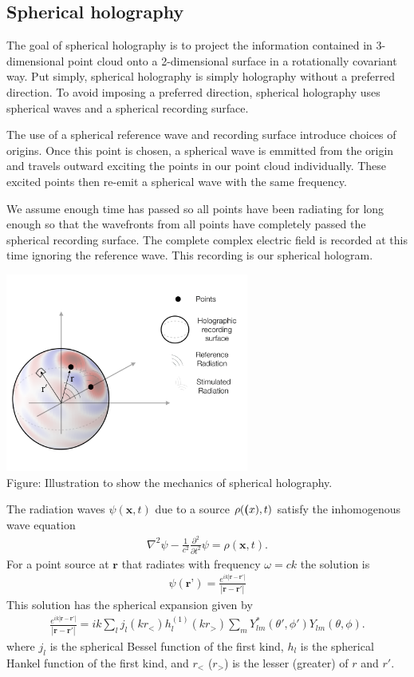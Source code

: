\documentclass{article}
\begin{document}
\subsection{Spherical holography}


The goal of spherical holography is to project the information contained in 3-dimensional point cloud onto a 2-dimensional surface in a rotationally covariant way. Put simply, spherical holography is simply holography without a preferred direction. To avoid imposing a preferred direction, spherical holography uses spherical waves and a spherical recording surface.

The use of a spherical reference wave and recording surface introduce choices of origins. Once this point is chosen, a spherical wave is emmitted from the origin and travels outward exciting the points in our point cloud individually. These excited points then re-emit a spherical wave with the same frequency. 

We assume enough time has passed so all points have been radiating for long enough so that the wavefronts from all points have completely passed the spherical recording surface. The complete complex electric field is recorded at this time ignoring the reference wave. This recording is our spherical hologram.

\begin{center}
\includegraphics[width=8cm]{hologram_example}\\
Figure: Illustration to show the mechanics of spherical holography. 
\end{center}
The radiation waves $\psi(\textbf{x},t)$ due to a source $\rho(\textbf(x),t)$ satisfy the inhomogenous wave equation
\begin{align}
    \nabla^2\psi - \frac{1}{c^2}\frac{\partial^2}{\partial t^2}\psi = \rho(\textbf{x},t).
\end{align}
For a point source at $\textbf{r}$ that radiates with frequency $\omega = ck$ the solution is 
\begin{align}
    \psi(\textbf{r'})
    =\frac{e^{ik|\textbf{r}-\textbf{r}'|}}{|\textbf{r}-\textbf{r}'|}
\end{align}
This solution has the spherical expansion given by 
\begin{align}
    \frac{e^{ik|\textbf{r}-\textbf{r}'|}}{|\textbf{r}-\textbf{r}'|} = ik\sum_lj_l(kr_<)h_l^{(1)}(kr_>)\sum_m Y^*_{lm}(\theta',\phi')Y_{lm}(\theta,\phi).
\end{align}
where $j_l$ is the spherical Bessel function of the first kind, $h_l$ is the spherical Hankel function of the first kind, and $r_<$ ($r_>$) is the lesser (greater) of $r$ and $r'$.
\end{document}
